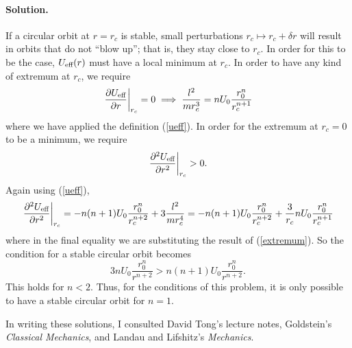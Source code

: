 \documentclass[11pt]{article}
\newcommand{\pder}[2]{\frac{\partial#1}{\partial#2}}
\newcommand{\pdder}[2]{\frac{\partial^2 #1}{\partial #2^2}}
\newcommand{\refeq}[1]{(\ref{#1})}
\newenvironment{solution}
{
    \paragraph{Solution.}
    \ignorespaces
}
{
    \bigskip\bigskip
}
\begin{document}
\begin{enumerate}
\begin{solution}
		If a circular orbit at $r = r_c$ is stable, small perturbations $r_c \mapsto r_c + \delta r$ will result in orbits that do not ``blow up''; that is, they stay close to $r_c$.  In order for this to be the case, $U_\text{eff}(r)$ must have a local minimum at $r_c$. In order to have any kind of extremum at $r_c$, we require
		\begin{equation} \label{extremum}
			\left. \pder{\Ueff}{r} \right|_{r_c} = 0 \implies \frac{l^2}{m r_c^3} = n U_0 \frac{r_0^n}{r_c^{n+1}}
		\end{equation}
		where we have applied the definition \refeq{ueff}.  In order for the extremum at $r_c = 0$ to be a minimum, we require
		\begin{equation}
			\left. \pdder{\Ueff}{r} \right|_{r_c} > 0.
		\end{equation}
		Again using \refeq{ueff},
		\begin{equation} \label{minimum}
			\left. \pdder{\Ueff}{r} \right|_{r_c} = -n (n+1) U_0 \frac{r_0^n}{r_c^{n+2}} + 3 \frac{l^2}{m r_c^4} = -n (n+1) U_0 \frac{r_0^n}{r_c^{n+2}} + \frac{3}{r_c} n U_0 \frac{r_0^n}{r_c^{n+1}}
		\end{equation}
		where in the final equality we are substituting the result of \refeq{extremum}.  So the condition for a stable circular orbit becomes
		\begin{equation}
			3 n U_0 \frac{r_0^n}{r^{n+2}} > n (n + 1) U_0 \frac{r_0^n}{r^{n+2}}.
		\end{equation}
		This holds for $n < 2$.  Thus, for the conditions of this problem, it is only possible to have a stable circular orbit for $n = 1$.
			
	\end{solution}

\end{enumerate}

In writing these solutions, I consulted David Tong's lecture notes, Goldstein's \emph{Classical Mechanics}, and Landau and Lifshitz's \emph{Mechanics}.
\end{document}
